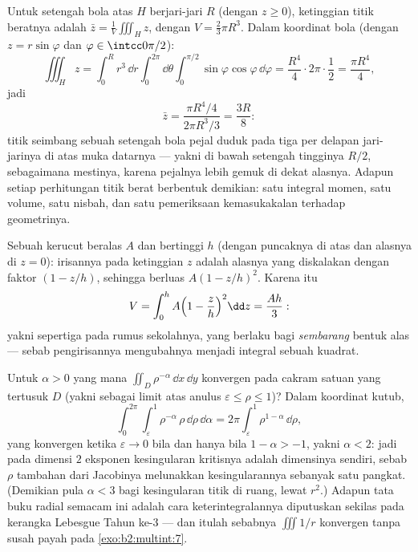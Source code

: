 \begin{example}\label{ex:b2:multint:centroid}
Untuk setengah bola atas $H$ berjari-jari $R$ (dengan $z \geq 0$),
ketinggian titik beratnya adalah $\bar z = \frac1{V}\iiint_H z$, dengan $V =
\frac23\pi R^3$. Dalam koordinat bola (dengan $z =
r\sin\varphi$ dan $\varphi \in \intcc0{\pi/2}$):
\[
\iiint_H z
= \int_0^R r^3\,\dd r\int_0^{2\pi}\dd\theta
\int_0^{\pi/2}\sin\varphi\cos\varphi\,\dd\varphi
= \frac{R^4}4\cdot2\pi\cdot\frac12 = \frac{\pi R^4}4 ,
\]
jadi
\[
\bar z = \frac{\pi R^4/4}{2\pi R^3/3} = \frac{3R}8 :
\]
titik seimbang sebuah setengah bola pejal duduk pada tiga per delapan
jari-jarinya di atas muka datarnya --- yakni di bawah setengah tingginya
$R/2$, sebagaimana mestinya, karena pejalnya lebih gemuk di dekat alasnya.
Adapun setiap perhitungan titik berat berbentuk demikian: satu integral
momen, satu volume, satu nisbah, dan satu pemeriksaan kemasukakalan
terhadap geometrinya.
\end{example}

\begin{example}\label{ex:b2:multint:cone}
Sebuah kerucut beralas  $A$ dan bertinggi $h$ (dengan puncaknya di atas dan alasnya di $z = 0$):
irisannya pada ketinggian $z$ adalah alasnya yang diskalakan dengan faktor $(1 -
z/h)$, sehingga berluas $A(1 - z/h)^2$. Karena itu
\[
V = \int_0^h A\Bigl(1 - \frac zh\Bigr)^2\dd z = \frac{Ah}{3} :
\]
yakni sepertiga pada rumus sekolahnya, yang berlaku bagi \emph{sembarang}
bentuk alas --- sebab pengirisannya mengubahnya menjadi integral sebuah kuadrat.
\end{example}

\begin{example}\label{ex:b2:multint:threshold}
Untuk $\alpha > 0$ yang mana $\iint_{D}\rho^{-\alpha}\,\dd
x\,\dd y$ konvergen pada cakram satuan yang tertusuk $D$ (yakni sebagai limit
atas anulus $\varepsilon \leq \rho \leq 1$)? Dalam koordinat
kutub,
\[
\int_0^{2\pi}\!\!\int_\varepsilon^1\rho^{-\alpha}\,
\rho\,\dd\rho\,\dd\alpha
= 2\pi\int_\varepsilon^1\rho^{1-\alpha}\,\dd\rho ,
\]
yang konvergen ketika $\varepsilon \to 0$ bila dan hanya bila $1 - \alpha > -1$,
yakni $\alpha < 2$: jadi pada dimensi $2$ eksponen kesingularan
kritisnya adalah dimensinya sendiri, sebab $\rho$ tambahan dari
Jacobinya melunakkan kesingularannya sebanyak satu pangkat. (Demikian pula
$\alpha < 3$ bagi kesingularan titik di ruang, lewat $r^2$.)
Adapun tata buku radial semacam ini adalah cara keterintegralannya
diputuskan sekilas pada kerangka Lebesgue Tahun ke-3 ---
dan itulah sebabnya $\iiint 1/r$ konvergen tanpa susah payah pada
\cref{exo:b2:multint:7}.
\end{example}

